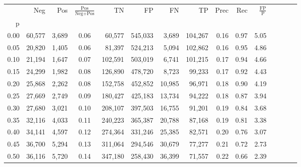 \begin{tabular}{rrrcrrrrrrrrrrr}
\toprule
{} &     Neg &     Pos & $\frac{\text{Pos}}{\text{Neg}+\text{Pos}}$ &       TN &       FP &       FN &       TP &  Prec &   Rec & $\frac{\text{FP}}{\text{P}}$ \\
p    &         &         &                                            &          &          &          &          &       &       &                              \\
\midrule
0.00 &  60,577 &   3,689 &                                       0.06 &   60,577 &  545,033 &    3,689 &  104,267 &  0.16 &  0.97 &                         5.05 \\
0.05 &  20,820 &   1,405 &                                       0.06 &   81,397 &  524,213 &    5,094 &  102,862 &  0.16 &  0.95 &                         4.86 \\
0.10 &  21,194 &   1,647 &                                       0.07 &  102,591 &  503,019 &    6,741 &  101,215 &  0.17 &  0.94 &                         4.66 \\
0.15 &  24,299 &   1,982 &                                       0.08 &  126,890 &  478,720 &    8,723 &   99,233 &  0.17 &  0.92 &                         4.43 \\
0.20 &  25,868 &   2,262 &                                       0.08 &  152,758 &  452,852 &   10,985 &   96,971 &  0.18 &  0.90 &                         4.19 \\
0.25 &  27,669 &   2,749 &                                       0.09 &  180,427 &  425,183 &   13,734 &   94,222 &  0.18 &  0.87 &                         3.94 \\
0.30 &  27,680 &   3,021 &                                       0.10 &  208,107 &  397,503 &   16,755 &   91,201 &  0.19 &  0.84 &                         3.68 \\
0.35 &  32,116 &   4,033 &                                       0.11 &  240,223 &  365,387 &   20,788 &   87,168 &  0.19 &  0.81 &                         3.38 \\
0.40 &  34,141 &   4,597 &                                       0.12 &  274,364 &  331,246 &   25,385 &   82,571 &  0.20 &  0.76 &                         3.07 \\
0.45 &  36,700 &   5,294 &                                       0.13 &  311,064 &  294,546 &   30,679 &   77,277 &  0.21 &  0.72 &                         2.73 \\
0.50 &  36,116 &   5,720 &                                       0.14 &  347,180 &  258,430 &   36,399 &   71,557 &  0.22 &  0.66 &                         2.39 \\

\end{tabular}
